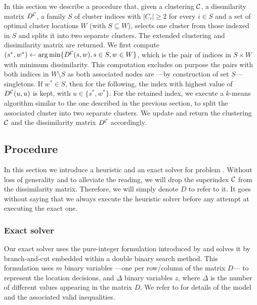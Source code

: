 \documentclass[ijoo,nonblindrev]{informs-ijoo}
\begin{document}
In this section we describe a procedure that, given a clustering $\mathcal{C}$, a dissmilarity matrix $D^{\mathcal{C}}$, a family $S$ of cluster indices with $|C_i|\geq 2$ for every $i\in S$ and a set of optimal cluster locations $W$ (with $S\subseteq W$), selects one cluster from those indexed in $S$ and splits it into two separate clusters. The extended clustering and dissimilarity matrix are returned. We first compute $(s^*, w^*)\leftarrow\arg\min\{D^{\mathcal{C}}(s, w), s\in S, w\in W\}$, which is the pair of indices in $S\times W$ with minimum dissimilarity. This computation excludes on purpose the pairs with both indices in $W\setminus S$ as both associated nodes are ---by construction of set $S$--- singletons. If $w^*\in S$, then for the following, the index with highest value of $D^{\mathcal{C}}(u, u)$ is kept, with $u \in \{s^*, w^*\}$. For the retained index, we execute a $k$-means algorithm similar to the one described in the previous section, to split the associated cluster into two separate clusters. We update and return the clustering $\mathcal{C}$ and the dissimilarity matrix $D^{\mathcal{C}}$ accordingly.

\subsection{Procedure \label{section:decrclust:solvepdp}}

In this section we introduce a heuristic and an exact solver for problem . Without loss of generality and to alleviate the reading, we will drop the superindex $\mathcal{C}$ from the dissimilarity matrix. Therefore, we will simply denote $D$ to refer to it. It goes without saying that we always execute the heuristic solver before any attempt at executing the exact one.

\subsubsection{Exact solver}

Our exact solver uses the pure-integer formulation introduced by \citet{Sayah2017new} and solves it by branch-and-cut embedded within a double binary search method. This formulation uses $m$ binary variables ---one per row/column of the matrix $D$--- to represent the location decisions, and $\Delta$ binary variables $z$, where $\Delta$ is the number of different values appearing in the matrix $D$. We refer to \citet{Sayah2017new} for details of the model and the associated valid inequalities.
\end{document}
